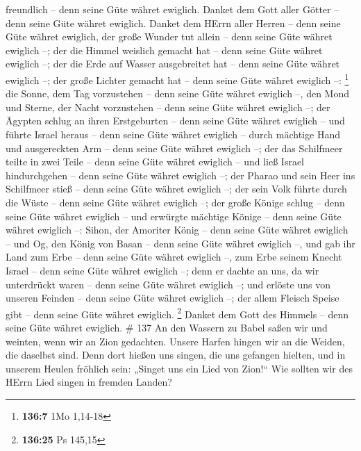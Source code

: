 freundlich -- denn seine Güte währet ewiglich.  Danket dem
Gott aller Götter -- denn seine Güte währet ewiglich. 
Danket dem HErrn aller Herren -- denn seine Güte währet ewiglich,
 der große Wunder tut allein -- denn seine Güte währet
ewiglich --;  der die Himmel weislich gemacht hat -- denn
seine Güte währet ewiglich --;  der die Erde auf Wasser
ausgebreitet hat -- denn seine Güte währet ewiglich --;  der
große Lichter gemacht hat -- denn seine Güte währet ewiglich --:
\footnote{\textbf{136:7} 1Mo 1,14-18}  die Sonne, dem Tag
vorzustehen -- denn seine Güte währet ewiglich --,  den Mond
und Sterne, der Nacht vorzustehen -- denn seine Güte währet ewiglich --;
 der Ägypten schlug an ihren Erstgeburten -- denn seine
Güte währet ewiglich --  und führte Israel heraus -- denn
seine Güte währet ewiglich --  durch mächtige Hand und
ausgereckten Arm -- denn seine Güte währet ewiglich --; 
der das Schilfmeer teilte in zwei Teile -- denn seine Güte währet
ewiglich --  und ließ Israel hindurchgehen -- denn seine
Güte währet ewiglich --;  der Pharao und sein Heer ins
Schilfmeer stieß -- denn seine Güte währet ewiglich --; 
der sein Volk führte durch die Wüste -- denn seine Güte währet ewiglich
--;  der große Könige schlug -- denn seine Güte währet
ewiglich --  und erwürgte mächtige Könige -- denn seine
Güte währet ewiglich --:  Sihon, der Amoriter König -- denn
seine Güte währet ewiglich --  und Og, den König von Basan
-- denn seine Güte währet ewiglich --,  und gab ihr Land
zum Erbe -- denn seine Güte währet ewiglich --,  zum Erbe
seinem Knecht Israel -- denn seine Güte währet ewiglich --;
 denn er dachte an uns, da wir unterdrückt waren -- denn
seine Güte währet ewiglich --;  und erlöste uns von unseren
Feinden -- denn seine Güte währet ewiglich --;  der allem
Fleisch Speise gibt -- denn seine Güte währet ewiglich. \footnote{\textbf{136:25}
  Ps 145,15}  Danket dem Gott des Himmels -- denn seine
Güte währet ewiglich. \# 137  An den Wassern zu Babel saßen
wir und weinten, wenn wir an Zion gedachten.  Unsere Harfen
hingen wir an die Weiden, die daselbst sind.  Denn dort
hießen uns singen, die uns gefangen hielten, und in unserem Heulen
fröhlich sein: „Singet uns ein Lied von Zion!{}``  Wie
sollten wir des HErrn Lied singen in fremden Landen? 
